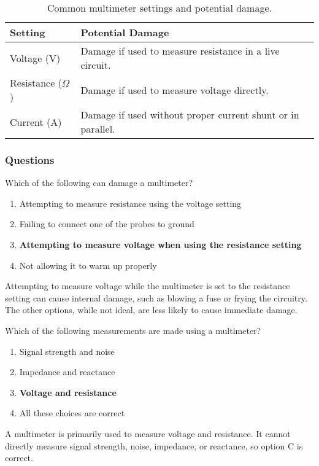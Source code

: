 \begin{table}[h]
    \centering
    \begin{tabular}{|l|l|}
        \hline
        \textbf{Setting} & \textbf{Potential Damage} \\
        \hline
        Voltage (V) & Damage if used to measure resistance in a live circuit. \\
        Resistance ($\Omega$) & Damage if used to measure voltage directly. \\
        Current (A) & Damage if used without proper current shunt or in parallel. \\
        \hline
    \end{tabular}
    \caption{Common multimeter settings and potential damage.}
    \label{tab:multimeter-damage}
\end{table}

\subsubsection*{Questions}

\begin{tcolorbox}[colback=gray!10!white,colframe=black!75!black,title={T7D06}]
    Which of the following can damage a multimeter?
    \begin{enumerate}[label=\Alph*),noitemsep]
        \item Attempting to measure resistance using the voltage setting
        \item Failing to connect one of the probes to ground
        \item \textbf{Attempting to measure voltage when using the resistance setting}
        \item Not allowing it to warm up properly
    \end{enumerate}
\end{tcolorbox}

Attempting to measure voltage while the multimeter is set to the resistance setting can cause internal damage, such as blowing a fuse or frying the circuitry. The other options, while not ideal, are less likely to cause immediate damage.

\begin{tcolorbox}[colback=gray!10!white,colframe=black!75!black,title={T7D07}]
    Which of the following measurements are made using a multimeter?
    \begin{enumerate}[label=\Alph*),noitemsep]
        \item Signal strength and noise
        \item Impedance and reactance
        \item \textbf{Voltage and resistance}
        \item All these choices are correct
    \end{enumerate}
\end{tcolorbox}

A multimeter is primarily used to measure voltage and resistance. It cannot directly measure signal strength, noise, impedance, or reactance, so option C is correct.
